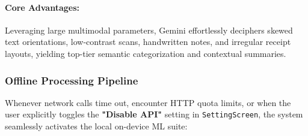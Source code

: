 \paragraph{Core Advantages:}
Leveraging large multimodal parameters, Gemini effortlessly deciphers skewed text orientations, low-contrast scans, handwritten notes, and irregular receipt layouts, yielding top-tier semantic categorization and contextual summaries.

\subsubsection{Offline Processing Pipeline}
Whenever network calls time out, encounter HTTP quota limits, or when the user explicitly toggles the \textbf{"Disable API"} setting in \texttt{SettingScreen}, the system seamlessly activates the local on-device ML suite:

